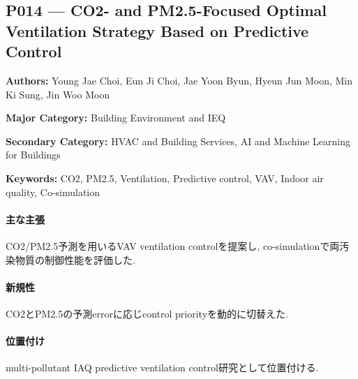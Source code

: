 \subsection{P014 --- CO2- and PM2.5-Focused Optimal Ventilation Strategy Based on Predictive Control}
\label{paper:P014}
\textbf{Authors:} Young Jae Choi, Eun Ji Choi, Jae Yoon Byun, Hyeun Jun Moon, Min Ki Sung, Jin Woo Moon\par
\textbf{Major Category:} Building Environment and IEQ\par
\textbf{Secondary Category:} HVAC and Building Services, AI and Machine Learning for Buildings\par
\textbf{Keywords:} CO2, PM2.5, Ventilation, Predictive control, VAV, Indoor air quality, Co-simulation\par
\paragraph{主な主張}
CO2/PM2.5予測を用いるVAV ventilation controlを提案し, co-simulationで両汚染物質の制御性能を評価した. \cite{Choi:2025CO2PM25Ventilation}
\paragraph{新規性}
CO2とPM2.5の予測errorに応じcontrol priorityを動的に切替えた.
\paragraph{位置付け}
multi-pollutant IAQ predictive ventilation control研究として位置付ける.
